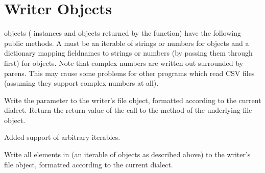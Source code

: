 \documentclass[letterpaper,10pt,english]{sphinxmanual}
\begin{document}
\section{Writer Objects}
\label{\detokenize{csv:writer-objects}}
 objects ({\hyperref[\detokenize{csv:csv.DictWriter}]{}} instances and objects returned by
the {\hyperref[\detokenize{csv:csv.writer}]{}} function) have the following public methods.  A  must be
an iterable of strings or numbers for  objects and a dictionary
mapping fieldnames to strings or numbers (by passing them through 
first) for {\hyperref[\detokenize{csv:csv.DictWriter}]{}} objects.  Note that complex numbers are written
out surrounded by parens. This may cause some problems for other programs which
read CSV files (assuming they support complex numbers at all).

\begin{fulllineitems}
\label{\detokenize{csv:csv.csvwriter.writerow}}
Write the  parameter to the writer’s file object, formatted according to
the current dialect. Return the return value of the call to the  method
of the underlying file object.

Added support of arbitrary iterables.

\end{fulllineitems}


\begin{fulllineitems}
\label{\detokenize{csv:csv.csvwriter.writerows}}
Write all elements in  (an iterable of  objects as described
above) to the writer’s file object, formatted according to the current
dialect.

\end{fulllineitems}
\end{document}
